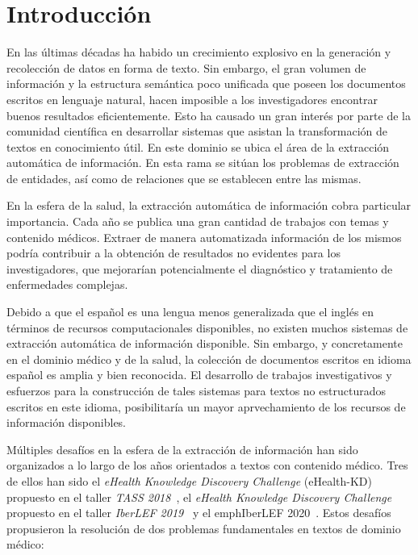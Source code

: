 \chapter*{Introducción}\label{chapter:introduction}

En las últimas décadas ha habido un crecimiento explosivo en la generación y recolección de datos en forma de texto.
Sin embargo, el gran volumen de información y la estructura semántica poco unificada que poseen los documentos escritos en lenguaje natural, hacen imposible a los investigadores encontrar buenos resultados eficientemente.
Esto ha causado un gran interés por parte de la comunidad científica en desarrollar sistemas que asistan la transformación de textos en conocimiento útil.
En este dominio se ubica el área de la extracción automática de información.
En esta rama se sitúan los problemas de extracción de entidades, así como de relaciones que se establecen entre las mismas. 

En la esfera de la salud, la extracción automática de información cobra particular importancia.
Cada año se publica una gran cantidad de trabajos con temas y contenido médicos.
Extraer de manera automatizada información de los mismos podría contribuir a la obtención de resultados no evidentes para los investigadores, que mejorarían potencialmente el diagnóstico y tratamiento de enfermedades complejas.

Debido a que el español es una lengua menos generalizada que el inglés en términos de recursos computacionales disponibles, no existen muchos sistemas de extracción automática de información disponible.
Sin embargo, y concretamente en el dominio médico y de la salud, la colección de documentos escritos en idioma español es amplia y bien reconocida.
El desarrollo de trabajos investigativos y esfuerzos para la construcción de tales sistemas para textos no estructurados escritos en este idioma, posibilitaría un mayor aprvechamiento de los recursos de información disponibles.

Múltiples desafíos en la esfera de la extracción de información han sido organizados a lo largo de los años orientados a textos con contenido médico.
Tres de ellos han sido el \emph{eHealth Knowledge Discovery Challenge} (eHealth-KD) propuesto en el taller \emph{TASS 2018}~\cite{martinez2018overview}, el \emph{eHealth Knowledge Discovery Challenge} propuesto en el taller \emph{IberLEF 2019}~\cite{ehealthkd19_overview} y el emph{IberLEF 2020}~\cite{ehealthkd20_overview}.
Estos desafíos propusieron la resolución de dos problemas fundamentales en textos de dominio médico:

